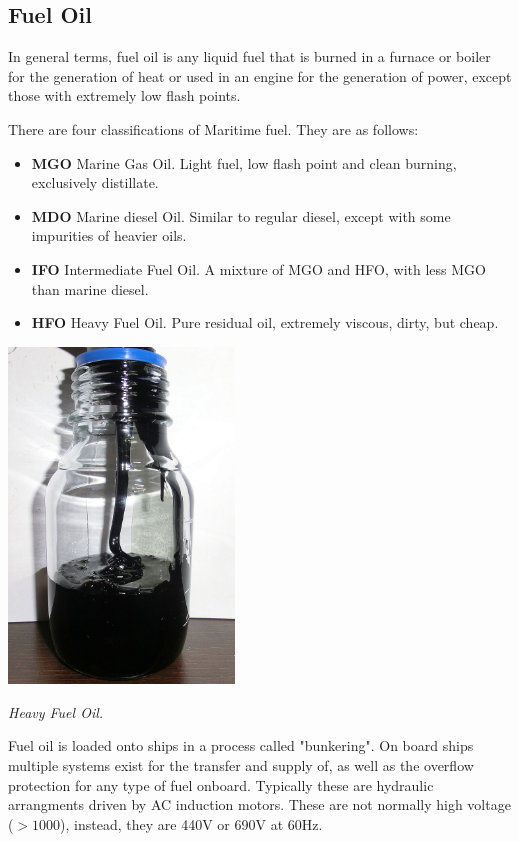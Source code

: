 \documentclass[11pt,a4paper]{article}
\begin{document}
\subsection{Fuel Oil}
In general terms, fuel oil is any liquid fuel that is burned in a furnace or boiler for the generation of heat or used in an engine for the generation of power, except those with extremely low flash points.

There are four classifications of Maritime fuel. They are as follows:
\begin{itemize}
\item \textbf{MGO} Marine Gas Oil. Light fuel, low flash point and clean burning, exclusively distillate.
\item \textbf{MDO} Marine diesel Oil. Similar to regular diesel, except with some impurities of heavier oils.
\item \textbf{IFO} Intermediate Fuel Oil. A mixture of MGO and HFO, with less MGO than marine diesel.
\item \textbf{HFO} Heavy Fuel Oil. Pure residual oil, extremely viscous, dirty, but cheap.
\end{itemize}
\begin{center}
\includegraphics[width=6cm]{hfo.jpg}\par
\textit{Heavy Fuel Oil.}
\end{center}
Fuel oil is loaded onto ships in a process called "bunkering". On board ships multiple systems exist for the transfer and supply of, as well as the overflow protection for any type of fuel onboard. Typically these are hydraulic arrangments driven by AC induction motors. These are not normally high voltage ($>1000$), instead, they are 440V or 690V at 60Hz.
\end{document}
